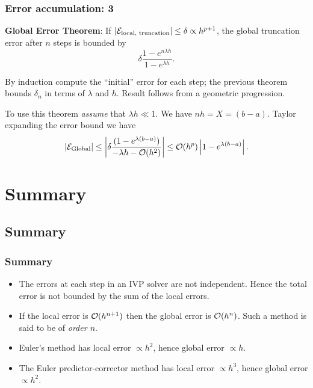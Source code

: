 \documentclass{beamer}
\begin{document}
\begin{frame}
  \frametitle{Error accumulation: 3}

  {\bf Global Error Theorem}: If $|{\cal E}_{\text{local,
      truncation}}| \le \delta \propto h^{p+1}$, the global truncation
  error after $n$ steps is bounded by
  \begin{equation*}
    \delta \frac{1 - e^{n \lambda h}}{1 - e^{\lambda h}}.
  \end{equation*} \pause

  \vspace{1ex}

  By induction compute the ``initial'' error for each step; the
  previous theorem bounds $\delta_n$ in terms of $\lambda$ and
  $h$. Result follows from a geometric progression.  \pause

  \vspace{1ex}

  To use this theorem \emph{assume} that $\lambda h \ll 1$. We have $n
  h = X = (b - a)$. Taylor expanding the error bound we have
  \begin{equation*}
    |{\cal E}_{\text{Global}}|  \leq \left| \delta \frac{(1 -
      e^{\lambda(b-a)})}{-\lambda h - {\cal O}(h^2)} \right|
    \leq {\cal O}(h^p) \left| 1 - e^{\lambda(b-a)} \right|.
  \end{equation*}

\end{frame}

\section{Summary}

\subsection{Summary}

\begin{frame}
  \frametitle{Summary}

  \begin{itemize}
  \item The errors at each step in an IVP solver are not independent.
    Hence the total error is not bounded by the sum of the local
    errors.
  \item If the local error is ${\cal O}(h^{n+1})$ then the global
    error is ${\cal O}(h^{n})$. Such a method is said to be of
    \emph{order $n$}.
  \item Euler's method has local error $\propto h^2$, hence global
    error $\propto h$.
  \item The Euler predictor-corrector method has local error $\propto
    h^3$, hence global error $\propto h^2$.
  \end{itemize}

\end{frame}
\end{document}
